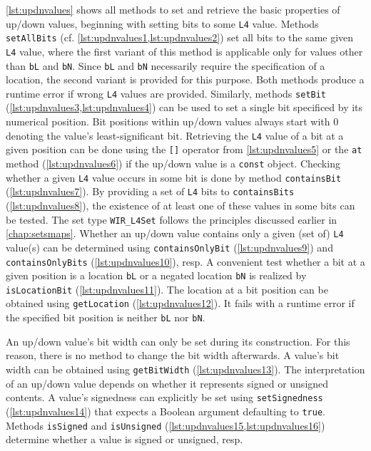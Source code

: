 \cref{lst:updnvalues} shows all methods to set and retrieve the basic properties of up/down values, beginning with setting bits to some \texttt{L4} value.
Methods \texttt{setAllBits} (cf. \cref{lst:updnvalues1,lst:updnvalues2}) set all bits to the same given \texttt{L4} value, where the first variant of this method is applicable only for values other than \texttt{bL} and \texttt{bN}.
Since \texttt{bL} and \texttt{bN} necessarily require the specification of a location, the second variant is provided for this purpose.
Both methods produce a runtime error if wrong \texttt{L4} values are provided.
Similarly, methods \texttt{setBit} (\cref{lst:updnvalues3,lst:updnvalues4}) can be used to set a single bit specificed by its numerical position.
Bit positions within up/down values always start with 0 denoting the value's least-significant bit.
Retrieving the \texttt{L4} value of a bit at a given position can be done using the \texttt{[]} operator from \cref{lst:updnvalues5} or the \texttt{at} method (\cref{lst:updnvalues6}) if the up/down value is a \texttt{const} object.
Checking whether a given \texttt{L4} value occurs in some bit is done by method \texttt{containsBit} (\cref{lst:updnvalues7}).
By providing a set of \texttt{L4} bits to \texttt{containsBits} (\cref{lst:updnvalues8}), the existence of at least one of these values in some bits can be tested.
The set type \texttt{WIR\_L4Set} follows the principles discussed earlier in \cref{chap:setsmaps}.
Whether an up/down value contains only a given (set of) \texttt{L4} value(s) can be determined using \texttt{containsOnlyBit} (\cref{lst:updnvalues9}) and \texttt{containsOnlyBits} (\cref{lst:updnvalues10}), resp.
A convenient test whether a bit at a given position is a location \texttt{bL} or a negated location \texttt{bN} is realized by \texttt{isLocationBit} (\cref{lst:updnvalues11}).
The location at a bit position can be obtained using \texttt{getLocation} (\cref{lst:updnvalues12}).
It fails with a runtime error if the specified bit position is neither \texttt{bL} nor \texttt{bN}.

An up/down value's bit width can only be set during its construction.
For this reason, there is no method to change the bit width afterwards.
A value's bit width can be obtained using \texttt{getBitWidth} (\cref{lst:updnvalues13}).
The interpretation of an up/down value depends on whether it represents signed or unsigned contents.
A value's signedness can explicitly be set using \texttt{setSignedness} (\cref{lst:updnvalues14}) that expects a Boolean argument defaulting to \texttt{true}.
Methods \texttt{isSigned} and \texttt{isUnsigned} (\cref{lst:updnvalues15,lst:updnvalues16}) determine whether a value is signed or unsigned, resp.

